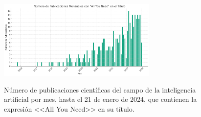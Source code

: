 \begin{figure}[H]
    \caption[Número de publicaciones científicas del campo de la inteligencia artificial por mes que contienen la expresión <<All You Need>> en su título]{Número de publicaciones científicas del campo de la inteligencia artificial por mes, hasta el 21 de enero de 2024, que contienen la expresión <<All You Need>> en su título.}
    \centering
    \includegraphics[width=0.7\textwidth]{./figuras/all_you_need_publicacionies_mensuales.png}
    \label{fig:all_you_need_publicaciones}
\end{figure}




